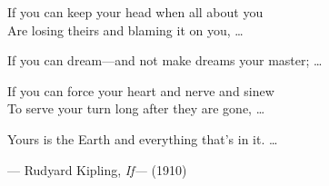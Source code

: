\cleardoublepage
\thispagestyle{empty}

\vspace*{\fill}

\begin{flushright}
\begin{minipage}{0.58\textwidth}
\itshape

If you can keep your head when all about you\\
Are losing theirs and blaming it on you, \ldots

\vspace{0.8em}

If you can dream---and not make dreams your master; \ldots

\vspace{0.8em}

If you can force your heart and nerve and sinew\\
To serve your turn long after they are gone, \ldots

\vspace{0.8em}

Yours is the Earth and everything that's in it. \ldots

\vspace{1.5em}

\raggedleft
--- Rudyard Kipling, \textit{If---} (1910)
\end{minipage}
\end{flushright}

\vspace*{\fill}

\cleardoublepage




\cleardoublepage
\thispagestyle{empty}

\vspace*{\fill}

